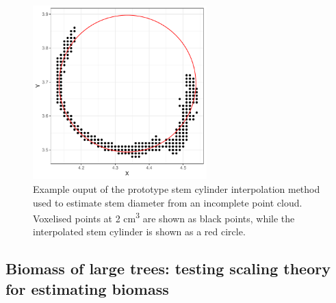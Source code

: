 \begin{refsection}
\begin{figure}[H]
\centering
	\includegraphics[width=0.6\textwidth]{img/cylinder}
	\caption{Example ouput of the prototype stem cylinder interpolation method used to estimate stem diameter from an incomplete point cloud. Voxelised points at 2 cm\textsuperscript{3} are shown as black points, while the interpolated stem cylinder is shown as a red circle.}
	\label{cylinder}
\end{figure}



\subsection{Biomass of large trees: testing scaling theory for estimating biomass}


\end{refsection}
